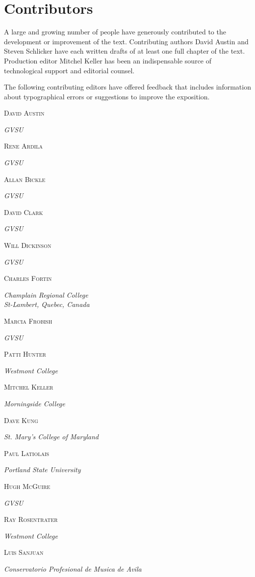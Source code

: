\documentclass[10pt,]{book}
\theoremstyle{plain}
\theoremstyle{definition}
\theoremstyle{definition}
\theoremstyle{definition}
\theoremstyle{definition}
\numberwithin{equation}{section}
\let\oldchapter\chapter
\renewcommand\chapter{\clearpage\gdef\znewpage{\global\let\znewpage\clearpage}\oldchapter}
\newcommand{\contributor}[1]{\parbox{\linewidth}{#1}\par\bigskip}
\newcommand{\contributorname}[1]{\textsc{#1}\\[0.25\baselineskip]}
\newcommand{\contributorinfo}[1]{\hspace*{0.05\linewidth}\parbox{0.95\linewidth}{\textsl{#1}}}
\begin{document}
\chapter*{Contributors}\label{preface-1}
\hypertarget{p-10}{}%
A large and growing number of people have generously contributed to the development or improvement of the text. Contributing authors David Austin and Steven Schlicker have each written drafts of at least one full chapter of the text. Production editor Mitchel Keller has been an indispensable source of technological support and editorial counsel.%
\par
\hypertarget{p-11}{}%
The following contributing editors have offered feedback that includes information about typographical errors or suggestions to improve the exposition.%
\begin{multicols}{2}
\hypertarget{contributor-1}{}%
\contributor{%
\contributorname{David Austin}%
\contributorinfo{GVSU}%
}%
\hypertarget{contributor-2}{}%
\contributor{%
\contributorname{Rene Ardila}%
\contributorinfo{GVSU}%
}%
\hypertarget{contributor-3}{}%
\contributor{%
\contributorname{Allan Bickle}%
\contributorinfo{GVSU}%
}%
\hypertarget{contributor-4}{}%
\contributor{%
\contributorname{David Clark}%
\contributorinfo{GVSU}%
}%
\hypertarget{contributor-5}{}%
\contributor{%
\contributorname{Will Dickinson}%
\contributorinfo{GVSU}%
}%
\hypertarget{contributor-6}{}%
\contributor{%
\contributorname{Charles Fortin}%
\contributorinfo{Champlain Regional College\\
St-Lambert, Quebec, Canada}%
}%
\hypertarget{contributor-7}{}%
\contributor{%
\contributorname{Marcia Frobish}%
\contributorinfo{GVSU}%
}%
\hypertarget{contributor-8}{}%
\contributor{%
\contributorname{Patti Hunter}%
\contributorinfo{Westmont College}%
}%
\hypertarget{contributor-9}{}%
\contributor{%
\contributorname{Mitchel Keller}%
\contributorinfo{Morningside College}%
}%
\hypertarget{contributor-10}{}%
\contributor{%
\contributorname{Dave Kung}%
\contributorinfo{St. Mary's College of Maryland}%
}%
\hypertarget{contributor-11}{}%
\contributor{%
\contributorname{Paul Latiolais}%
\contributorinfo{Portland State University}%
}%
\hypertarget{contributor-12}{}%
\contributor{%
\contributorname{Hugh McGuire}%
\contributorinfo{GVSU}%
}%
\hypertarget{contributor-13}{}%
\contributor{%
\contributorname{Ray Rosentrater}%
\contributorinfo{Westmont College}%
}%
\hypertarget{contributor-14}{}%
\contributor{%
\contributorname{Luis Sanjuan}%
\contributorinfo{Conservatorio Profesional de Musica de Avila\\
}}
\end{multicols}
\end{document}
